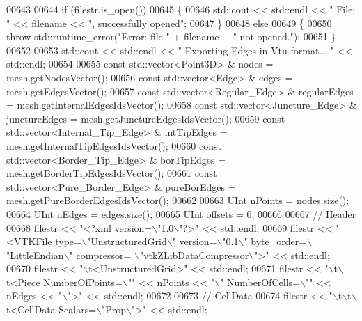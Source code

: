 \begin{DoxyCode}
00643 
00644     \textcolor{keywordflow}{if} (filestr.is\_open())
00645     \{
00646         std::cout << std::endl << \textcolor{stringliteral}{" File: "} << filename << \textcolor{stringliteral}{", successfully opened"};
00647     \}
00648     \textcolor{keywordflow}{else}
00649     \{
00650         \textcolor{keywordflow}{throw} std::runtime\_error(\textcolor{stringliteral}{"Error: file "} + filename + \textcolor{stringliteral}{" not opened."});
00651     \}
00652 
00653     std::cout << std::endl << \textcolor{stringliteral}{" Exporting Edges in Vtu format... "} << std::endl;
00654 
00655     \textcolor{keyword}{const} std::vector<Point3D> & nodes = mesh.getNodesVector();
00656     \textcolor{keyword}{const} std::vector<Edge> & edges = mesh.getEdgesVector();
00657     \textcolor{keyword}{const} std::vector<Regular\_Edge> & regularEdges = mesh.getInternalEdgesIdsVector();
00658     \textcolor{keyword}{const} std::vector<Juncture\_Edge> & junctureEdges = mesh.getJunctureEdgesIdsVector();
00659     \textcolor{keyword}{const} std::vector<Internal\_Tip\_Edge> & intTipEdges = mesh.getInternalTipEdgesIdsVector();
00660     \textcolor{keyword}{const} std::vector<Border\_Tip\_Edge> & borTipEdges = mesh.getBorderTipEdgesIdsVector();
00661     \textcolor{keyword}{const} std::vector<Pure\_Border\_Edge> & pureBorEdges = mesh.getPureBorderEdgesIdsVector();
00662 
00663     \hyperlink{namespaceFVCode3D_a4bf7e328c75d0fd504050d040ebe9eda}{UInt} nPoints = nodes.size();
00664     \hyperlink{namespaceFVCode3D_a4bf7e328c75d0fd504050d040ebe9eda}{UInt} nEdges = edges.size();
00665     \hyperlink{namespaceFVCode3D_a4bf7e328c75d0fd504050d040ebe9eda}{UInt} offsets = 0;
00666 
00667     \textcolor{comment}{// Header}
00668     filestr << \textcolor{stringliteral}{"<?xml version=\(\backslash\)"1.0\(\backslash\)"?>"} << std::endl;
00669     filestr << \textcolor{stringliteral}{"<VTKFile type=\(\backslash\)"UnstructuredGrid\(\backslash\)" version=\(\backslash\)"0.1\(\backslash\)" byte\_order=\(\backslash\)"LittleEndian\(\backslash\)" compressor=
      \(\backslash\)"vtkZLibDataCompressor\(\backslash\)">"} << std::endl;
00670     filestr << \textcolor{stringliteral}{"\(\backslash\)t<UnstructuredGrid>"} << std::endl;
00671     filestr << \textcolor{stringliteral}{"\(\backslash\)t\(\backslash\)t<Piece NumberOfPoints=\(\backslash\)""} << nPoints << \textcolor{stringliteral}{"\(\backslash\)" NumberOfCells=\(\backslash\)""} << nEdges << \textcolor{stringliteral}{"\(\backslash\)">"} << 
      std::endl;
00672 
00673     \textcolor{comment}{// CellData}
00674     filestr << \textcolor{stringliteral}{"\(\backslash\)t\(\backslash\)t\(\backslash\)t<CellData Scalars=\(\backslash\)"Prop\(\backslash\)">"} << std::endl;

\end{DoxyCode}
